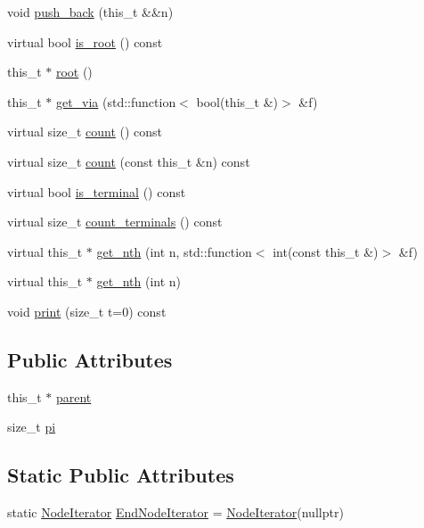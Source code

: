 \begin{DoxyCompactItemize}
void \hyperlink{class_base_node_a6971173d807967deda4501eb70676533}{push\+\_\+back} (this\+\_\+t \&\&n)
\item 
virtual bool \hyperlink{class_base_node_afce604388d562d347fcb31aeb2a8ef03}{is\+\_\+root} () const
\item 
this\+\_\+t $\ast$ \hyperlink{class_base_node_ab953456c09fa01bbf8a29c07f4d2b5ad}{root} ()
\item 
this\+\_\+t $\ast$ \hyperlink{class_base_node_add31235ad96e659230cbca6c9e357523}{get\+\_\+via} (std\+::function$<$ bool(this\+\_\+t \&)$>$ \&f)
\item 
virtual size\+\_\+t \hyperlink{class_base_node_a4007d1c72991b8599a6ff5a21c054ba5}{count} () const
\item 
virtual size\+\_\+t \hyperlink{class_base_node_aaaf113bd98ee404e71582ac1cf014ac0}{count} (const this\+\_\+t \&n) const
\item 
virtual bool \hyperlink{class_base_node_af37331cbec1b32c874138d2ae9b89745}{is\+\_\+terminal} () const
\item 
virtual size\+\_\+t \hyperlink{class_base_node_adb6326eefe4ddc311651b4a4a5cb119e}{count\+\_\+terminals} () const
\item 
virtual this\+\_\+t $\ast$ \hyperlink{class_base_node_a1e4560f882d4cdb713aea5178a4e2d86}{get\+\_\+nth} (int n, std\+::function$<$ int(const this\+\_\+t \&)$>$ \&f)
\item 
virtual this\+\_\+t $\ast$ \hyperlink{class_base_node_a9381814fdc86029905dc283da5d3d931}{get\+\_\+nth} (int n)
\item 
void \hyperlink{class_base_node_acbfcc951fe5858d0c85a5b3dc8843f05}{print} (size\+\_\+t t=0) const
\end{DoxyCompactItemize}
\subsection*{Public Attributes}
\begin{DoxyCompactItemize}
\item 
this\+\_\+t $\ast$ \hyperlink{class_base_node_aa1ad671f67931a82120d5852520417b7}{parent}
\item 
size\+\_\+t \hyperlink{class_base_node_a6e2caf1ce4e3f0436c277b7331dbd554}{pi}
\end{DoxyCompactItemize}
\subsection*{Static Public Attributes}
\begin{DoxyCompactItemize}
\item 
static \hyperlink{class_base_node_1_1_node_iterator}{Node\+Iterator} \hyperlink{class_base_node_ac8a2fe45180446f4db2d4742c34b5b80}{End\+Node\+Iterator} = \hyperlink{class_base_node_1_1_node_iterator}{Node\+Iterator}(nullptr)
\end{DoxyCompactItemize}
